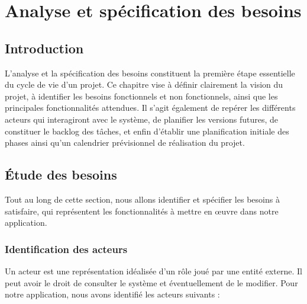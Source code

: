 \chapter{Analyse et spécification des besoins}

\section{Introduction}

L'analyse et la spécification des besoins constituent la première étape essentielle du cycle
de vie d'un projet. Ce chapitre vise à définir clairement la vision du projet, à identifier les
besoins fonctionnels et non fonctionnels, ainsi que les principales fonctionnalités attendues.
Il s'agit également de repérer les différents acteurs qui interagiront avec le système, de
planifier les versions futures, de constituer le backlog des tâches, et enfin d'établir une
planification initiale des phases ainsi qu'un calendrier prévisionnel de réalisation du projet.

\section{Étude des besoins}

Tout au long de cette section, nous allons identifier et spécifier les besoins à satisfaire, qui
représentent les fonctionnalités à mettre en œuvre dans notre application.

\subsection{Identification des acteurs}

Un acteur est une représentation idéalisée d'un rôle joué par une entité externe. Il peut
avoir le droit de consulter le système et éventuellement de le modifier. Pour notre application,
nous avons identifié les acteurs suivants :

